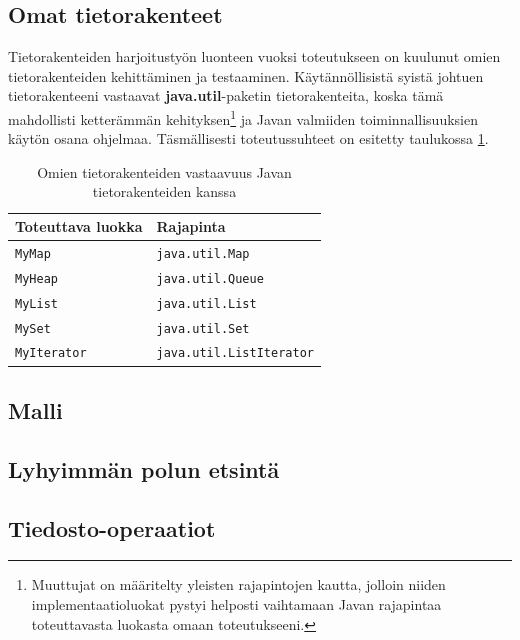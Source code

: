 \documentclass[10pt,a4paper]{article}
\begin{document}
\subsection{Omat tietorakenteet}
\label{datastructures}

Tietorakenteiden harjoitustyön luonteen vuoksi toteutukseen on kuulunut omien tietorakenteiden kehittäminen ja testaaminen. Käytännöllisistä syistä johtuen tietorakenteeni vastaavat \textbf{java.util}-paketin tietorakenteita, koska tämä mahdollisti ketterämmän kehityksen\footnote{Muuttujat on määritelty yleisten rajapintojen kautta, jolloin niiden implementaatioluokat pystyi helposti vaihtamaan Javan rajapintaa toteuttavasta luokasta omaan toteutukseeni.} ja Javan valmiiden toiminnallisuuksien käytön osana ohjelmaa. Täsmällisesti toteutussuhteet on esitetty taulukossa \ref{omat_tietorakenteet}.

\begin{table}

\begin{tabular}{l|l}
Toteuttava luokka & Rajapinta \\ 
\hline 
\texttt{MyMap} & \texttt{java.util.Map} \\
\texttt{MyHeap} & \texttt{java.util.Queue} \\ 
\texttt{MyList} & \texttt{java.util.List} \\ 
\texttt{MySet} & \texttt{java.util.Set} \\ 
\texttt{MyIterator} & \texttt{java.util.ListIterator} \\ 
\end{tabular} 

\caption{Omien tietorakenteiden vastaavuus Javan tietorakenteiden kanssa}
\label{omat_tietorakenteet}
\end{table}



\subsection{Malli}
\label{model.graph}

\subsection{Lyhyimmän polun etsintä}
\label{path}

\subsection{Tiedosto-operaatiot}
\label{io}
\end{document}

